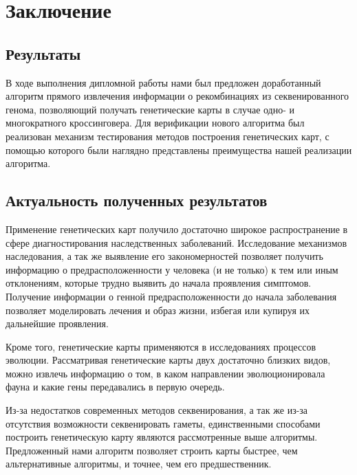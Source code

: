 \documentclass{matmex-diploma-custom}
\begin{document}
\section*{Заключение}

\subsection*{Результаты}

В ходе выполнения дипломной работы нами был предложен доработанный
алгоритм прямого извлечения информации о рекомбинациях из
секвенированного генома, позволяющий получать генетические карты в
случае одно- и многократного кроссинговера.  Для верификации нового
алгоритма был реализован механизм тестирования методов построения
генетических карт, с помощью которого были наглядно представлены
преимущества нашей реализации алгоритма.

\subsection*{Актуальность полученных результатов}

Применение генетических карт получило достаточно широкое
распространение в сфере диагностирования наследственных
заболеваний. Исследование механизмов наследования, а так же выявление
его закономерностей позволяет получить информацию о
предрасположенности у человека (и не только) к тем или иным
отклонениям, которые трудно выявить до начала проявления
симптомов. Получение информации о генной предрасположенности до начала
заболевания позволяет моделировать лечения и образ жизни, избегая или
купируя их дальнейшие проявления.

Кроме того, генетические карты применяются в исследованиях процессов
эволюции. Рассматривая генетические карты двух достаточно близких
видов, можно извлечь информацию о том, в каком направлении
эволюционировала фауна и какие гены передавались в первую очередь.

Из-за недостатков современных методов секвенирования, а так же из-за
отсутствия возможности секвенировать гаметы, единственными способами
построить генетическую карту являются рассмотренные выше
алгоритмы. Предложенный нами алгоритм позволяет строить карты быстрее,
чем альтернативные алгоритмы, и точнее, чем его предшественник.



\end{document}
